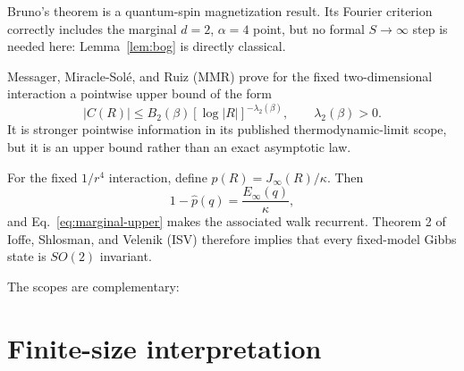 \documentclass[aps,prb,twocolumn,groupedaddress,amsmath,amssymb,
               superscriptaddress,nofootinbib,floatfix]{revtex4-2}
\theoremstyle{plain}
\theoremstyle{definition}
\begin{document}
Bruno's theorem \cite{Bruno2001} is a quantum-spin magnetization result.  Its
Fourier criterion correctly includes the marginal $d=2$, $\alpha=4$ point,
but no formal $S\to\infty$ step is needed here:
Lemma~\ref{lem:bog} is directly classical.

Messager, Miracle-Sol{\'e}, and Ruiz (MMR) \cite{Messager1984} prove for
the fixed two-dimensional interaction a pointwise upper bound of the form
\begin{equation}
 |C(R)|
 \le B_2(\beta)[\log|R|]^{-\lambda_2(\beta)},
 \qquad \lambda_2(\beta)>0.
\label{eq:MMR}
\end{equation}
It is stronger pointwise information in its published thermodynamic-limit
scope, but it is an upper bound rather than an exact asymptotic law.

For the fixed $1/r^4$ interaction, define
$p(R)=J_\infty(R)/\kappa$.  Then
\begin{equation}
 1-\widehat p(q)=\frac{E_\infty(q)}{\kappa},
\end{equation}
and Eq.~\eqref{eq:marginal-upper} makes the associated walk recurrent.
Theorem 2 of Ioffe, Shlosman, and Velenik (ISV) \cite{Ioffe2002} therefore
implies that every fixed-model Gibbs state is $SO(2)$ invariant.

The scopes are complementary:
\begin{center}
\end{center}

\section{Finite-size interpretation}
\end{document}
